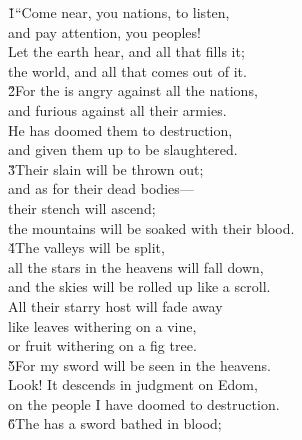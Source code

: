 \begin{poetry}
\poeml {}
\v{1}``Come near, you nations, to listen, \\
\poemll    and pay attention, you peoples! \\
\poeml Let the earth hear, and all that fills it; \\
\poemll    the world, and all that comes out of it. \\
\poeml \v{2}For the  is angry against all the nations, \\
\poemll    and furious against all their armies. \\
\poeml He has doomed them to destruction, \\
\poemll    and given them up to be slaughtered. \\
\poeml \v{3}Their slain will be thrown out; \\
\poemll    and as for their dead bodies--- \\
\poeml their stench will ascend; \\
\poemll    the mountains will be soaked with their blood. \\
\poeml \v{4}The valleys will be split, \\
\poemll    all the stars in the heavens will fall down, \\
\poemlll       and the skies will be rolled up like a scroll. \\
\poeml All their starry host will fade away \\
\poemll    like leaves withering on a vine, \\
\poemlll       or fruit withering on a fig tree. \\
\poeml \v{5}For my sword will be seen in the heavens. \\
\poemll    Look! It descends in judgment on Edom, \\
\poemlll       on the people I have doomed to destruction. \\
\poeml \v{6}The  has a sword bathed in blood; \\

\end{poetry}

